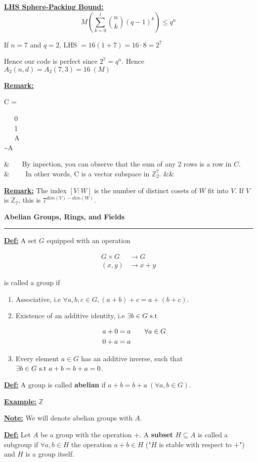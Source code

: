 \documentclass{article}
\newcommand{\header}[1]{
	\begin{Large}
	\noindent\textbf{#1}
	\vspace{2pt}
	\hrule
	\vspace{16pt}
	\end{Large}
	\normalsize
}
\renewcommand{\b}[1]{\textbf{#1}}
\newcommand{\ul}[1]{\underline{#1}}
\renewcommand{\aligned}[1]{
	\begin{align*}
		#1
	\end{align*}
}
\newcommand{\laligned}[1]{
	\begin{flalign*}
		#1 &&
	\end{flalign*}
}
\newcommand{\newdef}[2]{\b{\ul{#1:}} #2}
\newcommand{\st}{\textnormal{ s.t }}
\begin{document}
\newdef{LHS Sphere-Packing Bound}{
	\[M(\sum_{k=0}^{t} \binom{n}{k} (q-1)^k) \leq q^n\]

	If $n = 7$ and $q = 2$, LHS $= 16(1+7)=16\cdot8=2^7$

	Hence our code is perfect since $2^7=q^n$. Hence
	$A_2(n, d) = A_2(7, 3) = 16\ (M)$
}

\newdef{Remark}{
	\laligned{
		C = \begin{bmatrix}
			\ \ \ 0\ \ \\
			\ \ \ 1\ \ \\
			\ \ \ A\ \ \\
			\sim A\ \  \\
		\end{bmatrix} & \textnormal{
			\ \ \ By inpection, you can observe that the sum of any
			2 rows is a row in $C$.
		} \\
		& \textnormal{\ \ \ \ In other words, C is a vector subspace in
			$\mathbb{Z}_2^7$.}
	}
}

\newdef{Remark}{
	The index $[V: W]$ is the number of distinct cosets of $W$ fit into
	$V$. If $V$ is $\mathbb{Z}_7$, this is $7^{dim(V) - dim(W)}$.
}

\header{Abelian Groups, Rings, and Fields}

\newdef{Def}{
	A set $G$ equipped with an operation
	\aligned{
		G \times G & \rightarrow G     \\
		(x, y)     & \rightarrow x + y
	}
	is called a group if
	\begin{enumerate}
		\item Associative, i.e
		      $\forall a, b, c \in G, (a+b)+c = a + (b+c)$.
		\item Existence of an additive identity, i.e
		      $\exists b \in G \st$
		      \aligned{
			      a + 0 = a & \hspace{20px} \forall a \in G \\
			      0 + a = a &
		      }
		\item Every element $a \in G$ has an additive inverse, such
		      that $\exists b \in G \st a + b = b + a = 0$.
	\end{enumerate}
}

\newdef{Def}{
	A group is called \b{abelian} if $a+b = b+a\ (\forall a, b \in G)$.
}

\newdef{Example}{$\mathbb{Z}$}

\newdef{Note}{We will denote abelian groups with $A$.}

\newdef{Def}{
	Let $A$ be a group with the operation $+$. A \b{subset} $H \subseteq A$
	is called a subgroup if $\forall a, b \in H$ the operation $a+b \in H$
	("$H$ is stable with respect to $+$") and $H$ is a group itself.
}
\end{document}
